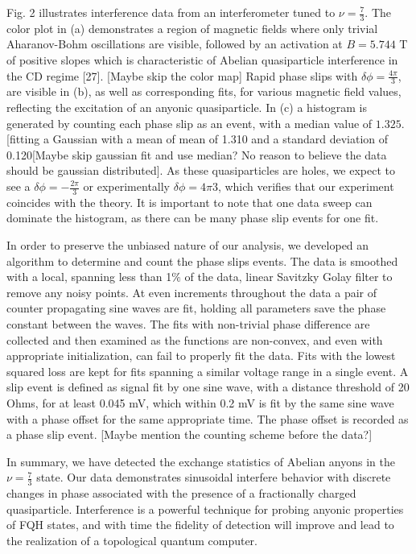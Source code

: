 \documentclass[]{article}
\begin{document}
	
Fig. 2 illustrates interference data from an interferometer tuned to $\nu = \frac{7}{3}$. The color plot in (a) demonstrates a region of magnetic fields where only trivial Aharanov-Bohm oscillations are visible, followed by an activation at $B=5.744$ T of positive slopes which is characteristic of Abelian quasiparticle interference in the CD regime [27]. [Maybe skip the color map] Rapid phase slips with $\delta\phi = \frac{4\pi}{3}$, are visible in (b), as well as corresponding fits, for various magnetic field values, reflecting the excitation of an anyonic quasiparticle. In (c) a histogram is generated by counting each phase slip as an event, with a median value of $1.325$. [fitting a Gaussian with a mean of mean of 1.310 and a standard deviation of 0.120[Maybe skip gaussian fit and use median? No reason to believe the data should be gaussian distributed]. As these quasiparticles are holes, we expect to see a $\delta\phi = -\frac{2\pi}{3}$ or experimentally $\delta\phi = {4\pi}{3}$, which verifies that our experiment coincides with the theory. It is important to note that one data sweep can dominate the histogram, as there can be many phase slip events for one fit. 


In order to preserve the unbiased nature of our analysis, we developed an algorithm to determine and count the phase slips events. The data is smoothed with a local, spanning less than 1$\%$ of the data, linear Savitzky Golay filter to remove any noisy points.  At even increments throughout the data a pair of counter propagating sine waves are fit, holding all parameters save the phase constant between the waves. The fits with non-trivial phase difference are collected and then examined as the functions are non-convex, and even with appropriate initialization, can fail to properly fit the data. Fits with the lowest squared loss are kept for fits spanning a similar voltage range in a single event. A slip event is defined as signal fit by one sine wave, with a distance threshold of 20 Ohms, for at least 0.045 mV, which within 0.2 mV is fit by the same sine wave with a phase offset for the same appropriate time. The phase offset is recorded as a phase slip event. [Maybe mention the counting scheme before the data?] 


In summary, we have detected the exchange statistics of Abelian anyons in the $\nu=\frac{7}{3}$ state. Our data demonstrates sinusoidal interfere behavior with discrete changes in phase associated with the presence of a fractionally charged quasiparticle. Interference is a powerful technique for probing anyonic properties of FQH states, and with time the fidelity of detection will improve and lead to the realization of a topological quantum computer.

 
\end{document}
